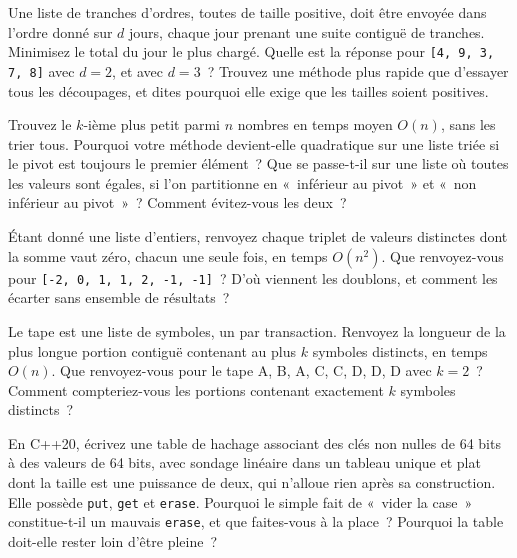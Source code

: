 \begin{question}\label{iq:iv3:algorithms:35}
Une liste de tranches d'ordres, toutes de taille positive, doit être envoyée dans l'ordre donné sur $d$ jours, chaque jour prenant une suite contiguë de tranches. Minimisez le total du jour le plus chargé. Quelle est la réponse pour \texttt{[4, 9, 3, 7, 8]} avec $d = 2$, et avec $d = 3$~? Trouvez une méthode plus rapide que d'essayer tous les découpages, et dites pourquoi elle exige que les tailles soient positives.
\end{question}

\begin{question}\label{iq:iv3:algorithms:36}
Trouvez le $k$-ième plus petit parmi $n$ nombres en temps moyen $O(n)$, sans les trier tous. Pourquoi votre méthode devient-elle quadratique sur une liste triée si le pivot est toujours le premier élément~? Que se passe-t-il sur une liste où toutes les valeurs sont égales, si l'on partitionne en «~inférieur au pivot~» et «~non inférieur au pivot~»~? Comment évitez-vous les deux~?
\end{question}

\begin{question}\label{iq:iv3:algorithms:37}
Étant donné une liste d'entiers, renvoyez chaque triplet de valeurs distinctes dont la somme vaut zéro, chacun une seule fois, en temps $O(n^2)$. Que renvoyez-vous pour \texttt{[-2, 0, 1, 1, 2, -1, -1]}~? D'où viennent les doublons, et comment les écarter sans ensemble de résultats~?
\end{question}

\begin{question}\label{iq:iv3:algorithms:38}
Le tape est une liste de symboles, un par transaction. Renvoyez la longueur de la plus longue portion contiguë contenant au plus $k$ symboles distincts, en temps $O(n)$. Que renvoyez-vous pour le tape A, B, A, C, C, D, D, D avec $k = 2$~? Comment compteriez-vous les portions contenant exactement $k$ symboles distincts~?
\end{question}

\begin{question}\label{iq:iv3:algorithms:39}
En C++20, écrivez une table de hachage associant des clés non nulles de 64 bits à des valeurs de 64 bits, avec sondage linéaire dans un tableau unique et plat dont la taille est une puissance de deux, qui n'alloue rien après sa construction. Elle possède \texttt{put}, \texttt{get} et \texttt{erase}. Pourquoi le simple fait de «~vider la case~» constitue-t-il un mauvais \texttt{erase}, et que faites-vous à la place~? Pourquoi la table doit-elle rester loin d'être pleine~?
\end{question}

